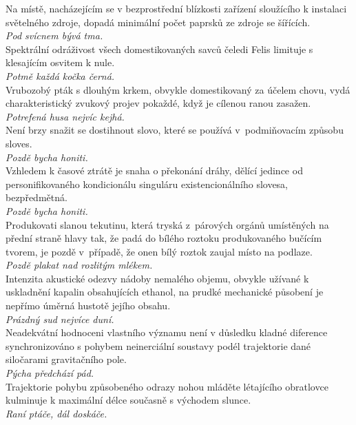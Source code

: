 \begin{multicols}{2}
\noindent
Na místě, nacházejícím se v bezprostřední blízkosti zařízení
sloužícího k instalaci světelného zdroje, dopadá minimální počet
paprsků ze zdroje se šířících.\\[1 mm]
{\sl Pod svícnem bývá tma.}\\

\noindent
Spektrální odráživost všech domestikovaných savců čeledi
Felis limituje s klesajícím osvitem k nule.\\[1 mm]
{\sl Potmě každá kočka černá.}\\

\noindent
Vrubozobý pták s dlouhým krkem, obvykle domestikovaný za
účelem chovu, vydá charakteristický zvukový projev pokaždé,
když je cílenou ranou zasažen.\\[1 mm]
{\sl Potrefená husa nejvíc kejhá.}\\

\noindent
Není brzy snažit se dostihnout slovo, které se používá v~podmiňovacím
způsobu sloves.\\[1 mm]
{\sl Pozdě bycha honiti.}\\

\noindent
Vzhledem k časové ztrátě je snaha o překonání dráhy, dělící
jedince od personifikovaného kondicionálu singuláru existencionálního
slovesa, bezpředmětná.\\[1 mm]
{\sl Pozdě bycha honiti.}\\

\noindent
Produkovati slanou tekutinu, která tryská z~párových orgánů
umístěných na přední straně hlavy tak, že padá do bílého roztoku
produkovaného bučícím tvorem, je pozdě v~případě, že onen bílý
roztok zaujal místo na podlaze.\\[1 mm]
{\sl Pozdě plakat nad rozlitým mlékem.}\\

\noindent
Intenzita akustické odezvy nádoby nemalého objemu, obvykle
užívané k uskladnění kapalin obsahujících ethanol, na prudké
mechanické působení je nepřímo úměrná hustotě jejího obsahu.\\[1 mm]
{\sl Prázdný sud nejvíce duní.}\\

\noindent
Neadekvátní hodnoceni vlastního významu není v důsledku kladné
diference synchronizováno s pohybem neinerciální soustavy podél
trajektorie dané siločarami gravitačního pole.\\[1 mm]
{\sl Pýcha předchází pád.}\\

\noindent
Trajektorie pohybu způsobeného odrazy nohou mláděte létajícího
obratlovce kulminuje k maximální délce současně s východem slunce.\\[1 mm]
{\sl Raní ptáče, dál doskáče.}\\


\end{multicols}
